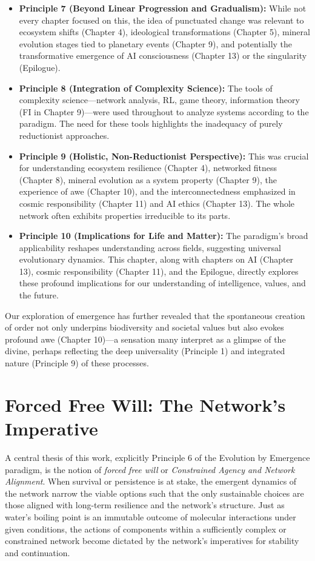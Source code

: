 \documentclass[12pt,openany]{book}
\begin{document}
\begin{itemize}
    \item \textbf{Principle 7 (Beyond Linear Progression and Gradualism):} While not every chapter focused on this, the idea of punctuated change was relevant to ecosystem shifts (Chapter 4), ideological transformations (Chapter 5), mineral evolution stages tied to planetary events (Chapter 9), and potentially the transformative emergence of AI consciousness (Chapter 13) or the singularity (Epilogue).

    \item \textbf{Principle 8 (Integration of Complexity Science):} The tools of complexity science—network analysis, RL, game theory, information theory (FI in Chapter 9)—were used throughout to analyze systems according to the paradigm. The need for these tools highlights the inadequacy of purely reductionist approaches.

    \item \textbf{Principle 9 (Holistic, Non-Reductionist Perspective):} This was crucial for understanding ecosystem resilience (Chapter 4), networked fitness (Chapter 8), mineral evolution as a system property (Chapter 9), the experience of awe (Chapter 10), and the interconnectedness emphasized in cosmic responsibility (Chapter 11) and AI ethics (Chapter 13). The whole network often exhibits properties irreducible to its parts.

    \item \textbf{Principle 10 (Implications for Life and Matter):} The paradigm's broad applicability reshapes understanding across fields, suggesting universal evolutionary dynamics. This chapter, along with chapters on AI (Chapter 13), cosmic responsibility (Chapter 11), and the Epilogue, directly explores these profound implications for our understanding of intelligence, values, and the future.
\end{itemize}
Our exploration of emergence has further revealed that the spontaneous creation of order not only underpins biodiversity and societal values but also evokes profound awe (Chapter 10)—a sensation many interpret as a glimpse of the divine, perhaps reflecting the deep universality (Principle 1) and integrated nature (Principle 9) of these processes. %

\section{Forced Free Will: The Network's Imperative}
A central thesis of this work, explicitly Principle 6 of the Evolution by Emergence paradigm, is the notion of \emph{forced free will} or \emph{Constrained Agency and Network Alignment}. When survival or persistence is at stake, the emergent dynamics of the network narrow the viable options such that the only sustainable choices are those aligned with long-term resilience and the network's structure. Just as water’s boiling point is an immutable outcome of molecular interactions under given conditions, the actions of components within a sufficiently complex or constrained network become dictated by the network’s imperatives for stability and continuation.
\end{document}
